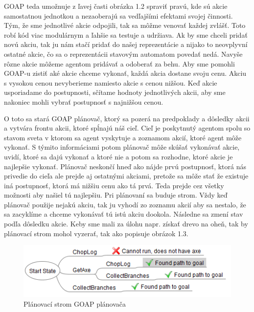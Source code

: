 GOAP teda umožnuje z ľavej časti obrázka 1.2 spraviť pravú, kde sú akcie samostatnou jednotkou a nezaoberajú sa vedľajšími efektami svojej činnosti. Tým, že sme jednotlivé akcie odpojili, tak sa môžme venovať každej zvlášť. Toto robí kód viac modulárnym a ľahšie sa testuje a udržiava. Ak by sme chceli pridať novú akciu, tak ju nám stačí pridať do našej reprezentácie a nijako to neovplyvní ostatné akcie, čo sa o reprezentácii stavovým automatom povedať nedá. Navyše rôzne akcie môžeme agentom pridávať a odoberať za behu. Aby sme pomohli GOAP-u zistiť aké akcie chceme vykonať, každá akcia dostane svoju cenu. Akciu s vysokou cenou nevyberieme namiesto akcie s cenou nižšou. Keď akcie usporiadame do postupnosti, sčítame hodnoty jednotlivých akcii, aby sme nakoniec mohli vybrať postupnosť s najnižšou cenou.\par
O toto sa stará GOAP plánovač, ktorý sa pozerá na predpoklady a dôsledky akcii a vytvára frontu akcii, ktoré spĺnajú náš cieľ. Cieľ je poskytnutý agentom spolu so stavom sveta v ktorom sa agent vyskytuje a zoznamom akcií, ktoré agent môže vykonať. S týmito informáciami potom plánovač môže skúšať vykonávať akcie, uvidí, ktoré sa dajú vykonať a ktoré nie a potom sa rozhodne, ktoré akcie je najlepšie vykonať. Plánovač neskončí hneď ako nájde prvú postupnosť, ktorá nás privedie do cieľa ale prejde aj ostatnými akciami, pretože sa môže stať že existuje iná postupnosť, ktorá má nižšiu cenu ako tá prvá. Teda prejde cez všetky možnosti aby našiel tú najlepšiu. Pri plánovaní sa buduje strom. Vždy keď plánovač použije nejakú akciu, tak ju vyhodí zo zoznamu akcií aby sa nestalo, že sa zacyklíme a chceme vykonávať tú istú akciu dookola. Následne sa zmení stav podľa dôsledku akcie. Keby sme mali za úlohu napr. získať drevo na oheň, tak by plánovací strom mohol vyzerať, tak ako popisuje obrázok 1.3.
\begin{figure}[H] 
\begin{center}
\includegraphics[scale=1.0]{img/plan_tree.png}
\caption{Plánovací strom GOAP plánovača \cite{goap}}
\label{fig:ch13}
\end{center}
\end{figure}

